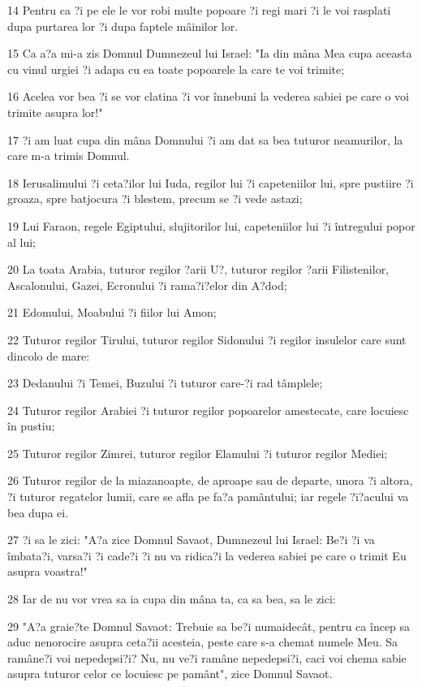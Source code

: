 \par 14 Pentru ca ?i pe ele le vor robi multe popoare ?i regi mari ?i le voi rasplati dupa purtarea lor ?i dupa faptele mâinilor lor.
\par 15 Ca a?a mi-a zis Domnul Dumnezeul lui Israel: "Ia din mâna Mea cupa aceasta cu vinul urgiei ?i adapa cu ea toate popoarele la care te voi trimite;
\par 16 Acelea vor bea ?i se vor clatina ?i vor înnebuni la vederea sabiei pe care o voi trimite asupra lor!"
\par 17 ?i am luat cupa din mâna Domnului ?i am dat sa bea tuturor neamurilor, la care m-a trimis Domnul.
\par 18 Ierusalimului ?i ceta?ilor lui Iuda, regilor lui ?i capeteniilor lui, spre pustiire ?i groaza, spre batjocura ?i blestem, precum se ?i vede astazi;
\par 19 Lui Faraon, regele Egiptului, slujitorilor lui, capeteniilor lui ?i întregului popor al lui;
\par 20 La toata Arabia, tuturor regilor ?arii U?, tuturor regilor ?arii Filistenilor, Ascalonului, Gazei, Ecronului ?i rama?i?elor din A?dod;
\par 21 Edomului, Moabului ?i fiilor lui Amon;
\par 22 Tuturor regilor Tirului, tuturor regilor Sidonului ?i regilor insulelor care sunt dincolo de mare:
\par 23 Dedanului ?i Temei, Buzului ?i tuturor care-?i rad tâmplele;
\par 24 Tuturor regilor Arabiei ?i tuturor regilor popoarelor amestecate, care locuiesc în pustiu;
\par 25 Tuturor regilor Zimrei, tuturor regilor Elamului ?i tuturor regilor Mediei;
\par 26 Tuturor regilor de la miazanoapte, de aproape sau de departe, unora ?i altora, ?i tuturor regatelor lumii, care se afla pe fa?a pamântului; iar regele ?i?acului va bea dupa ei.
\par 27 ?i sa le zici: "A?a zice Domnul Savaot, Dumnezeul lui Israel: Be?i ?i va îmbata?i, varsa?i ?i cade?i ?i nu va ridica?i la vederea sabiei pe care o trimit Eu asupra voastra!"
\par 28 Iar de nu vor vrea sa ia cupa din mâna ta, ca sa bea, sa le zici:
\par 29 "A?a graie?te Domnul Savaot: Trebuie sa be?i numaidecât, pentru ca încep sa aduc nenorocire asupra ceta?ii acesteia, peste care s-a chemat numele Meu. Sa ramâne?i voi nepedepsi?i? Nu, nu ve?i ramâne nepedepsi?i, caci voi chema sabie asupra tuturor celor ce locuiesc pe pamânt", zice Domnul Savaot.
